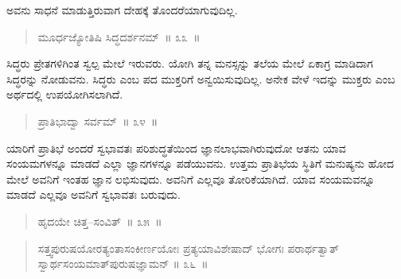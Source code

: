 
\vspace{0.1cm}

ಅವನು ಸಾಧನೆ ಮಾಡುತ್ತಿರುವಾಗ ದೇಹಕ್ಕೆ ತೊಂದರೆಯಾಗುವುದಿಲ್ಲ. 

\vspace{-0.2cm}

\begin{verse}
ಮೂರ್ಧಜ್ಯೋತಿಷಿ ಸಿದ್ಧದರ್ಶನಮ್​~॥ ೩೩~॥
\end{verse}

\vspace{-0.4cm}


\vspace{0.1cm}

ಸಿದ್ಧರು ಪ್ರೇತಗಳಿಗಿಂತ ಸ್ವಲ್ಪ ಮೇಲೆ ಇರುವರು. ಯೋಗಿ ತನ್ನ ಮನಸ್ಸನ್ನು ತಲೆಯ ಮೇಲೆ ಏಕಾಗ್ರ ಮಾಡಿದಾಗ ಸಿದ್ಧರನ್ನು ನೋಡುವನು. ಸಿದ್ಧರು ಎಂಬ ಪದ ಮುಕ್ತರಿಗೆ ಅನ್ವಯಿಸುವುದಿಲ್ಲ. ಅನೇಕ ವೇಳೆ ಇದನ್ನು ಮುಕ್ತರು ಎಂಬ ಅರ್ಥದಲ್ಲಿ ಉಪಯೋಗಿಸಲಾಗಿದೆ. 

\vspace{-0.2cm}

\begin{verse}
ಪ್ರಾತಿಭಾದ್ವಾ ಸರ್ವಮ್​~॥ ೩೪~॥
\end{verse}

\vspace{-0.4cm}


\vspace{0.1cm}

ಯಾರಿಗೆ ಪ್ರಾತಿಭೆ ಅಂದರೆ ಸ್ವಭಾವತಃ ಪರಿಶುದ್ಧತೆಯಿಂದ ಜ್ಞಾನಲಾಭವಾಗಿರುವುದೋ ಆತನು ಯಾವ ಸಂಯಮಗಳನ್ನೂ ಮಾಡದೆ ಎಲ್ಲಾ ಜ್ಞಾನಗಳನ್ನೂ ಪಡೆಯುವನು. ಉತ್ತಮ ಪ್ರಾತಿಭೆಯ ಸ್ಥಿತಿಗೆ ಮನುಷ್ಯನು ಹೋದ ಮೇಲೆ ಅವನಿಗೆ ಇಂತಹ ಜ್ಞಾನ ಲಭಿಸುವುದು. ಅವನಿಗೆ ಎಲ್ಲವೂ ತೋರಿಕೆಯಾಗಿದೆ. ಯಾವ ಸಂಯಮವನ್ನೂ ಮಾಡದೆ ಎಲ್ಲವೂ ಅವನಿಗೆ ಸ್ವಭಾವತಃ ಬರುವುದು. 

\vspace{-0.2cm}

\begin{verse}
ಹೃದಯೇ ಚಿತ್ತ–ಸಂವಿತ್​~॥ ೩೫~॥
\end{verse}

\vspace{-0.4cm}


\vspace{-0.2cm}

\begin{verse}
ಸತ್ತ್ವಪುರುಷಯೋರತ್ಯಂತಾಸಂಕೀರ್ಣಯೋಃ ಪ್ರತ್ಯಯಾವಿಶೇಷಾದ್​ ಭೋಗಃ ಪರಾರ್ಥತ್ವಾತ್​ ಸ್ವಾರ್ಥಸಂಯಮಾತ್​ ಪುರುಷಜ್ಞಾಮನ್​ \hfill{॥ ೩೬~॥}
\end{verse}

